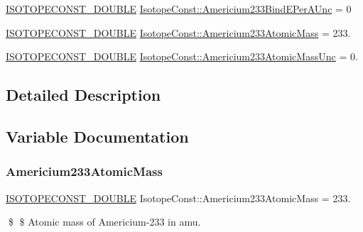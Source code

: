 \begin{DoxyCompactItemize}
\mbox{\hyperlink{group___isotope_const-_macros_ga8f45a7272ce02c0b4c65c44636ed719a}{I\+S\+O\+T\+O\+P\+E\+C\+O\+N\+S\+T\+\_\+\+D\+O\+U\+B\+LE}} \mbox{\hyperlink{group___isotope_const-_americium-_am233_ga7858bf921f7f487ef6cb1eb74f808697}{Isotope\+Const\+::\+Americium233\+Bind\+E\+Per\+A\+Unc}} = 0
\item 
\mbox{\hyperlink{group___isotope_const-_macros_ga8f45a7272ce02c0b4c65c44636ed719a}{I\+S\+O\+T\+O\+P\+E\+C\+O\+N\+S\+T\+\_\+\+D\+O\+U\+B\+LE}} \mbox{\hyperlink{group___isotope_const-_americium-_am233_ga12c616cbc002d034895444ffd3c018b5}{Isotope\+Const\+::\+Americium233\+Atomic\+Mass}} = 233.
\item 
\mbox{\hyperlink{group___isotope_const-_macros_ga8f45a7272ce02c0b4c65c44636ed719a}{I\+S\+O\+T\+O\+P\+E\+C\+O\+N\+S\+T\+\_\+\+D\+O\+U\+B\+LE}} \mbox{\hyperlink{group___isotope_const-_americium-_am233_ga6007577b9ed4a7b97fa143e50ff5532f}{Isotope\+Const\+::\+Americium233\+Atomic\+Mass\+Unc}} = 0.
\end{DoxyCompactItemize}


\subsection{Detailed Description}


\subsection{Variable Documentation}
\mbox{\label{group___isotope_const-_americium-_am233_ga12c616cbc002d034895444ffd3c018b5}} 
\subsubsection{\texorpdfstring{Americium233\+Atomic\+Mass}{Americium233AtomicMass}}
{\footnotesize\ttfamily \mbox{\hyperlink{group___isotope_const-_macros_ga8f45a7272ce02c0b4c65c44636ed719a}{I\+S\+O\+T\+O\+P\+E\+C\+O\+N\+S\+T\+\_\+\+D\+O\+U\+B\+LE}} Isotope\+Const\+::\+Americium233\+Atomic\+Mass = 233.}

\$ \$ Atomic mass of Americium-\/233 in amu. \mbox{\label{group___isotope_const-_americium-_am233_ga6007577b9ed4a7b97fa143e50ff5532f}} 
